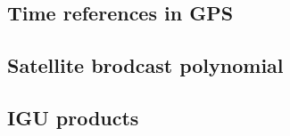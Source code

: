 \subsection{Time references in GPS}

\subsection{Satellite brodcast polynomial}

\subsection{IGU products}
